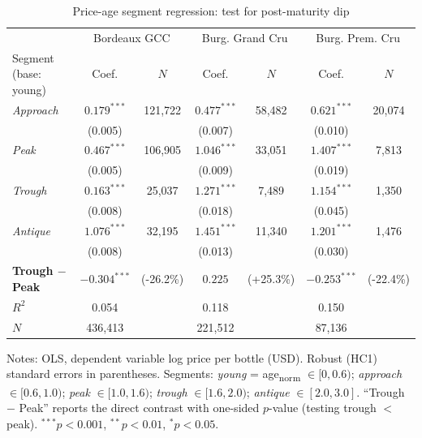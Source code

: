 \begin{table}[htbp]
\centering
\caption{Price-age segment regression: test for post-maturity dip}
\label{tab:segment_dip}
\small
\begin{tabular}{lcccccc}
\toprule
 & \multicolumn{2}{c}{Bordeaux GCC} & \multicolumn{2}{c}{Burg. Grand Cru} & \multicolumn{2}{c}{Burg. Prem. Cru} \\
Segment (base: young) & Coef. & $N$ & Coef. & $N$ & Coef. & $N$ \\
\midrule
\textit{Approach} & $0.179^{***}$ & 121,722 & $0.477^{***}$ & 58,482 & $0.621^{***}$ & 20,074 \\
  & \small (0.005) &  & \small (0.007) &  & \small (0.010) \\
\textit{Peak} & $0.467^{***}$ & 106,905 & $1.046^{***}$ & 33,051 & $1.407^{***}$ & 7,813 \\
  & \small (0.005) &  & \small (0.009) &  & \small (0.019) \\
\textit{Trough} & $0.163^{***}$ & 25,037 & $1.271^{***}$ & 7,489 & $1.154^{***}$ & 1,350 \\
  & \small (0.008) &  & \small (0.018) &  & \small (0.045) \\
\textit{Antique} & $1.076^{***}$ & 32,195 & $1.451^{***}$ & 11,340 & $1.201^{***}$ & 1,476 \\
  & \small (0.008) &  & \small (0.013) &  & \small (0.030) \\
\midrule
\textbf{Trough $-$ Peak} & $-0.304^{***}$ & (-26.2\%) & $0.225$ & (+25.3\%) & $-0.253^{***}$ & (-22.4\%) \\
\midrule
$R^2$ & 0.054 &  & 0.118 &  & 0.150 & \\
$N$ & 436,413 &  & 221,512 &  & 87,136 & \\
\bottomrule
\end{tabular}
\begin{tablenotes}
\footnotesize
\item Notes: OLS, dependent variable log price per bottle (USD). Robust (HC1) standard errors
  in parentheses. Segments: \textit{young} = age\textsubscript{norm} $\in [0, 0.6)$;
  \textit{approach} $\in [0.6, 1.0)$; \textit{peak} $\in [1.0, 1.6)$;
  \textit{trough} $\in [1.6, 2.0)$; \textit{antique} $\in [2.0, 3.0]$.
  ``Trough $-$ Peak'' reports the direct contrast with one-sided $p$-value (testing trough $<$ peak).
  $^{***}p<0.001$, $^{**}p<0.01$, $^{*}p<0.05$.
\end{tablenotes}
\end{table}
